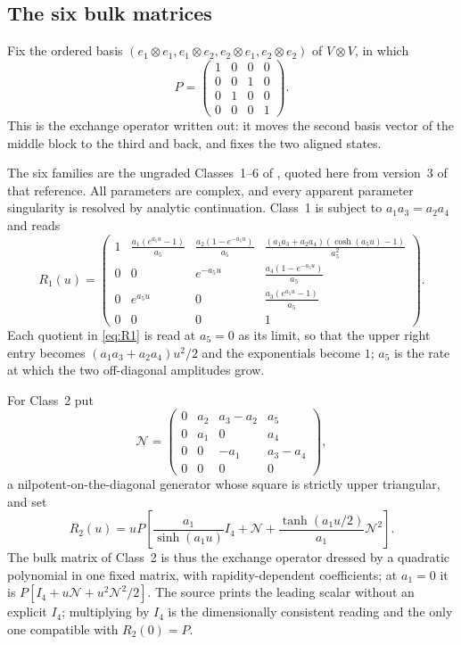 \documentclass[11pt,reqno]{amsart}
\theoremstyle{plain}
\theoremstyle{definition}
\theoremstyle{remark}
\numberwithin{equation}{section}
\begin{document}
\subsection{The six bulk matrices}
\label{subsec:sixmatrices}

Fix the ordered basis $(e_1\otimes e_1,e_1\otimes e_2,e_2\otimes e_1,e_2\otimes
e_2)$ of $V\otimes V$, in which
\begin{equation}
P=\begin{pmatrix}1&0&0&0\\0&0&1&0\\0&1&0&0\\0&0&0&1\end{pmatrix}.
\label{eq:P}
\end{equation}
This is the exchange operator written out: it moves the second basis vector of
the middle block to the third and back, and fixes the two aligned states.

The six families are the ungraded Classes~1--6 of \cite{deLeeuw2019}, quoted here
from version~3 of that reference. All parameters are complex, and every apparent
parameter singularity is resolved by analytic continuation. Class~1 is subject to
$a_1a_3=a_2a_4$ and reads
\begin{equation}
R_1(u)=\begin{pmatrix}
1&\frac{a_1(e^{a_5u}-1)}{a_5}&\frac{a_2(1-e^{-a_5u})}{a_5}&
\frac{(a_1a_3+a_2a_4)(\cosh(a_5u)-1)}{a_5^2}\\
0&0&e^{-a_5u}&\frac{a_4(1-e^{-a_5u})}{a_5}\\
0&e^{a_5u}&0&\frac{a_3(e^{a_5u}-1)}{a_5}\\
0&0&0&1
\end{pmatrix}.                                      \label{eq:R1}
\end{equation}
Each quotient in \cref{eq:R1} is read at $a_5=0$ as its limit, so that the upper
right entry becomes $(a_1a_3+a_2a_4)u^2/2$ and the exponentials become $1$;
$a_5$ is the rate at which the two off-diagonal amplitudes grow.

For Class~2 put
\begin{equation}
\mathcal N=\begin{pmatrix}
0&a_2&a_3-a_2&a_5\\0&a_1&0&a_4\\
0&0&-a_1&a_3-a_4\\0&0&0&0
\end{pmatrix},
\label{eq:C2-N}
\end{equation}
a nilpotent-on-the-diagonal generator whose square is strictly upper triangular,
and set
\begin{equation}
R_2(u)=uP\left[
\frac{a_1}{\sinh(a_1u)}I_4+\mathcal N+
\frac{\tanh(a_1u/2)}{a_1}\mathcal N^2\right].             \label{eq:R2}
\end{equation}
The bulk matrix of Class~2 is thus the exchange operator dressed by a quadratic
polynomial in one fixed matrix, with rapidity-dependent coefficients; at $a_1=0$
it is $P[I_4+u\mathcal N+u^2\mathcal N^2/2]$. The source prints the leading
scalar without an explicit $I_4$; multiplying by $I_4$ is the dimensionally
consistent reading and the only one compatible with $R_2(0)=P$.
\end{document}
